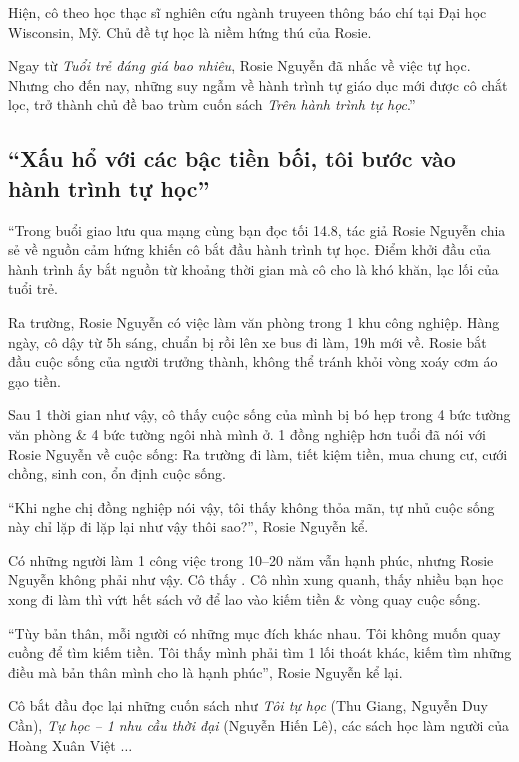 \documentclass[oneside]{book}
\numberwithin{equation}{section}
\begin{document}
Hiện, cô theo học thạc sĩ nghiên cứu ngành truyeen thông báo chí tại Đại học Wisconsin, Mỹ. Chủ đề tự học là niềm hứng thú của Rosie.

Ngay từ \textit{Tuổi trẻ đáng giá bao nhiêu}, Rosie Nguyễn đã nhắc về việc tự học. Nhưng cho đến nay, những suy ngẫm về hành trình tự giáo dục mới được cô chắt lọc, trở thành chủ đề bao trùm cuốn sách \textit{Trên hành trình tự học}.''

\subsection{``Xấu hổ với các bậc tiền bối, tôi bước vào hành trình tự học''}
``Trong buổi giao lưu qua mạng cùng bạn đọc tối 14.8, tác giả Rosie Nguyễn chia sẻ về nguồn cảm hứng khiến cô bắt đầu hành trình tự học. Điểm khởi đầu của hành trình ấy bắt nguồn từ khoảng thời gian mà cô cho là khó khăn, lạc lối của tuổi trẻ.

Ra trường, Rosie Nguyễn có việc làm văn phòng trong 1 khu công nghiệp. Hàng ngày, cô dậy từ 5h sáng, chuẩn bị rồi lên xe bus đi làm, 19h mới về. Rosie bắt đầu cuộc sống của người trưởng thành, không thể tránh khỏi vòng xoáy cơm áo gạo tiền.

Sau 1 thời gian như vậy, cô thấy cuộc sống của mình bị bó hẹp trong 4 bức tường văn phòng \& 4 bức tường ngôi nhà mình ở. 1 đồng nghiệp hơn tuổi đã nói với Rosie Nguyễn về cuộc sống: Ra trường đi làm, tiết kiệm tiền, mua chung cư, cưới chồng, sinh con, ổn định cuộc sống.

``Khi nghe chị đồng nghiệp nói vậy, tôi thấy không thỏa mãn, tự nhủ cuộc sống này chỉ lặp đi lặp lại như vậy thôi sao?'', Rosie Nguyễn kể.

Có những người làm 1 công việc trong 10--20 năm vẫn hạnh phúc, nhưng Rosie Nguyễn không phải như vậy. Cô thấy . Cô nhìn xung quanh, thấy nhiều bạn học xong đi làm thì vứt hết sách vở để lao vào kiếm tiền \& vòng quay cuộc sống.

``Tùy bản thân, mỗi người có những mục đích khác nhau. Tôi không muốn quay cuồng để tìm kiếm tiền. Tôi thấy mình phải tìm 1 lối thoát khác, kiếm tìm những điều mà bản thân mình cho là hạnh phúc'', Rosie Nguyễn kể lại.

Cô bắt đầu đọc lại những cuốn sách như \textit{Tôi tự học} (Thu Giang, Nguyễn Duy Cần), \textit{Tự học -- 1 nhu cầu thời đại} (Nguyễn Hiến Lê), các sách học làm người của Hoàng Xuân Việt $\ldots$
\end{document}
